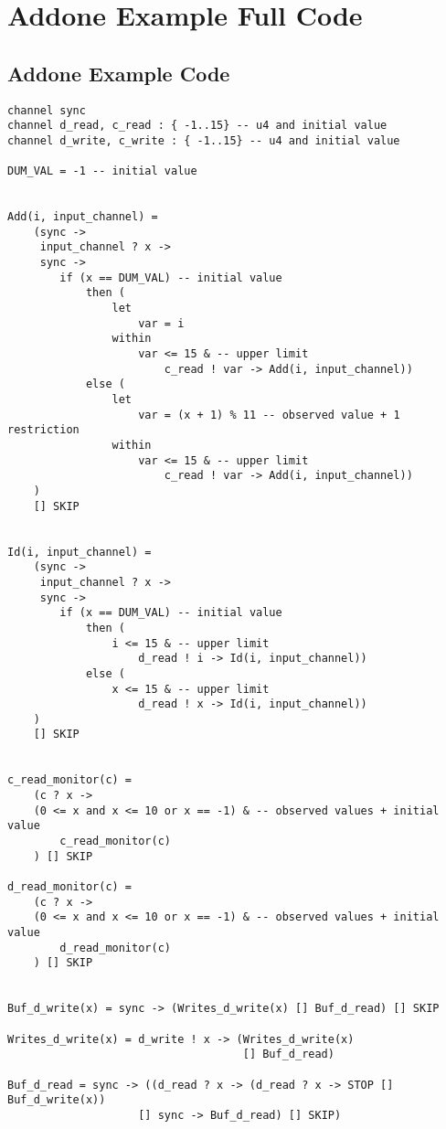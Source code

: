\chapter{Addone Example Full \cspm{} Code}
\label{app:addone}
\section*{Addone Example \cspm{} Code}
\begin{verbatim}
channel sync
channel d_read, c_read : { -1..15} -- u4 and initial value
channel d_write, c_write : { -1..15} -- u4 and initial value

DUM_VAL = -1 -- initial value


Add(i, input_channel) =
    (sync ->
     input_channel ? x ->
     sync ->
        if (x == DUM_VAL) -- initial value
            then (
                let
                    var = i
                within
                    var <= 15 & -- upper limit
                        c_read ! var -> Add(i, input_channel))
            else (
                let
                    var = (x + 1) % 11 -- observed value + 1 restriction
                within
                    var <= 15 & -- upper limit
                        c_read ! var -> Add(i, input_channel))
    )
    [] SKIP


Id(i, input_channel) =
    (sync ->
     input_channel ? x ->
     sync ->
        if (x == DUM_VAL) -- initial value
            then (
                i <= 15 & -- upper limit
                    d_read ! i -> Id(i, input_channel))
            else (
                x <= 15 & -- upper limit
                    d_read ! x -> Id(i, input_channel))
    )
    [] SKIP


c_read_monitor(c) =
    (c ? x ->
    (0 <= x and x <= 10 or x == -1) & -- observed values + initial value
        c_read_monitor(c)
    ) [] SKIP

d_read_monitor(c) =
    (c ? x ->
    (0 <= x and x <= 10 or x == -1) & -- observed values + initial value
        d_read_monitor(c)
    ) [] SKIP


Buf_d_write(x) = sync -> (Writes_d_write(x) [] Buf_d_read) [] SKIP

Writes_d_write(x) = d_write ! x -> (Writes_d_write(x)
                                    [] Buf_d_read)

Buf_d_read = sync -> ((d_read ? x -> (d_read ? x -> STOP [] Buf_d_write(x))
                    [] sync -> Buf_d_read) [] SKIP)




\end{verbatim}
